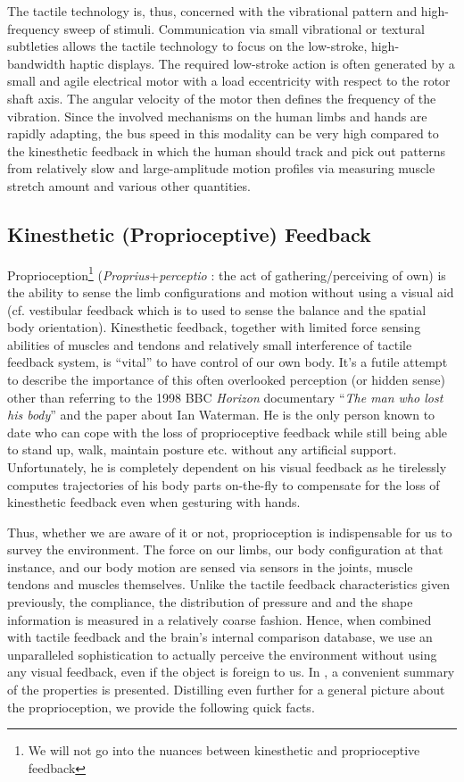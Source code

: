 The tactile technology is, thus, concerned with the vibrational pattern and high-frequency sweep of stimuli. Communication via small 
vibrational or textural subtleties allows the tactile technology to focus on the low-stroke, high-bandwidth haptic displays. The required 
low-stroke action is often generated by a small and agile electrical motor with a load eccentricity with respect to the rotor shaft axis. 
The angular velocity of the motor then defines the frequency of the vibration. Since the involved mechanisms on the human limbs and hands 
are rapidly adapting, the bus speed in this modality can be very high compared to the kinesthetic feedback in which the human should 
track and pick out patterns from relatively slow and large-amplitude motion profiles via measuring muscle stretch amount and various 
other quantities. 


\subsection{Kinesthetic (Proprioceptive) Feedback}
Proprioception\footnote{We will not go into the nuances between kinesthetic and proprioceptive feedback} (\emph{Proprius}+\emph{perceptio}
: the act of gathering/perceiving of own) is the ability to sense the limb configurations and motion without using a visual aid (cf. 
vestibular feedback which is to used to sense the balance and the spatial body orientation). Kinesthetic feedback, together with limited 
force sensing abilities of muscles and tendons and relatively small interference of tactile feedback system, is \enquote{vital} to have 
control of our own body. It's a futile attempt to describe the importance of this often overlooked perception (or hidden sense) other 
than referring to the 1998 BBC \emph{Horizon} documentary \enquote{\emph{The man who lost his body}} and the paper \cite{waterman} about 
Ian Waterman. He is the only person known to date who can cope with the loss of proprioceptive feedback while still being able to stand 
up, walk, maintain posture etc. without any artificial support. Unfortunately, he is completely dependent on his visual feedback as he 
tirelessly computes trajectories of his body parts on-the-fly to compensate for the loss of kinesthetic feedback even when gesturing with 
hands. 

Thus, whether we are aware of it or not, proprioception is indispensable for us to survey the environment. The force on our limbs, our 
body configuration at that instance, and our body motion are sensed via sensors in the joints, muscle tendons and muscles themselves. Unlike 
the tactile feedback characteristics given previously, the compliance, the distribution of pressure and and the shape information is 
measured in a relatively coarse fashion. Hence, when combined with tactile feedback and the brain's internal comparison database, we use 
an unparalleled sophistication to actually perceive the environment without using any visual feedback, even if the object is foreign to us. 
In \cite{biggssrinivasan}, a convenient summary of the properties is presented. Distilling even further for a general picture about the 
proprioception, we provide the following quick facts. 

